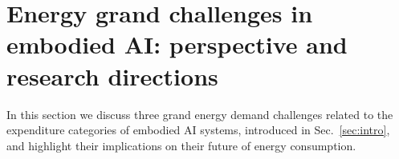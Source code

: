 \section{Energy grand challenges in embodied AI: perspective and research directions}\label{sec:energy_grand_challenges}
In this section we discuss three grand energy demand challenges related to the expenditure categories of embodied AI systems, introduced in Sec.~\ref{sec:intro}, and highlight their implications on their future of energy consumption.

